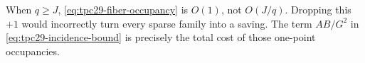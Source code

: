 \begin{remark}
\label{rem:tpc29-plus-one}
When $q\ge J$, \eqref{eq:tpc29-fiber-occupancy} is $O(1)$, not
$O(J/q)$.  Dropping this $+1$ would incorrectly turn every sparse
family into a saving.  The term $AB/G^2$ in
\eqref{eq:tpc29-incidence-bound} is precisely the total cost of those
one-point occupancies.
\end{remark}
